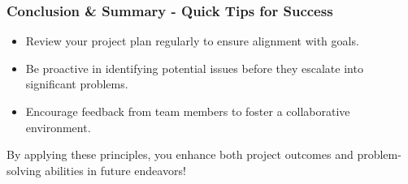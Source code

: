 \documentclass[aspectratio=169]{beamer}
\begin{document}
\begin{frame}[fragile]
    \frametitle{Conclusion \& Summary - Quick Tips for Success}
    \begin{itemize}
        \item Review your project plan regularly to ensure alignment with goals.
        \item Be proactive in identifying potential issues before they escalate into significant problems.
        \item Encourage feedback from team members to foster a collaborative environment.
    \end{itemize}

    By applying these principles, you enhance both project outcomes and problem-solving abilities in future endeavors!
\end{frame}
\end{document}
